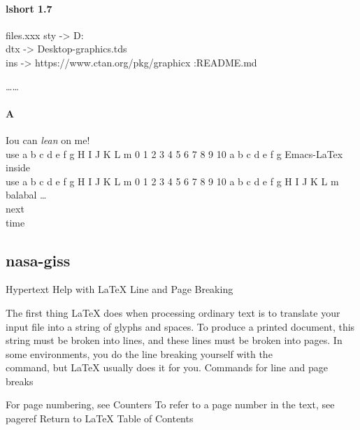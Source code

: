 \documentclass[a4paper,11pt]{book} %
\begin{document}
\paragraph{lshort 1.7}files.xxx
sty -> D:\tex\latex
\\dtx -> Desktop\Math\TUG\latex-graphics.tds\source\latex\graphics
\\ins -> https://www.ctan.org/pkg/graphicx :README.md

……

\paragraph{A}
Iou can \textsl{lean} on me!
\\%
use a b c d e f g H I J K L m 0 1 2 3 4 5 6 7 8 9 10 a b c d e f g
\linebreak[3] Emacs-LaTex inside
\\
use a b c d e f g H I J K L m 0 1 2 3 4 5 6 7 8 9 10 a b c d e f g H I J K L m
\\
balabal \ldots{} %
\LaTeXe
\\
next
\\%
time

\begin{comment}
so, so
you think
you can tell
heaven from hell
\end{comment}

\subsection{nasa-giss}
Hypertext Help with LaTeX
Line and Page Breaking

The first thing LaTeX does when processing ordinary text is to translate your input file into a string of glyphs and spaces. To produce a printed document, this string must be broken into lines, and these lines must be broken into pages. In some environments, you do the line breaking yourself with the \\ command, but LaTeX usually does it for you.
Commands for line and page breaks
%
%

For page numbering, see Counters
To refer to a page number in the text, see \newline pageref
Return to LaTeX Table of Contents
\end{document}

